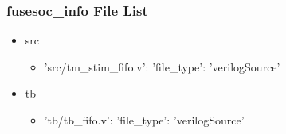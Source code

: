 \subsubsection{fusesoc\_info File List}
\begin{itemize}
\item src
	\begin{itemize}
	\item {'src/tm\_stim\_fifo.v': {'file\_type': 'verilogSource'}}
	\end{itemize}
\item tb
	\begin{itemize}
	\item {'tb/tb\_fifo.v': {'file\_type': 'verilogSource'}}
	\end{itemize}
\end{itemize}
